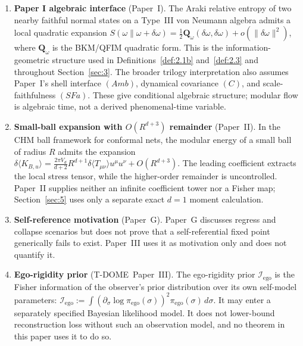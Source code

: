 \documentclass[12pt]{article}
\theoremstyle{definition}
\theoremstyle{remark}
\begin{document}
\begin{enumerate}
\item \textbf{Paper I algebraic interface} (Paper~I\cite{PaperI}).
The Araki relative entropy of two nearby faithful normal states on a
Type~III von Neumann algebra admits a local quadratic expansion
\(S(\omega\|\omega+\delta\omega)=\tfrac{1}{2}\mathbf{Q}_\omega
(\delta\omega,\delta\omega)+o(\|\delta\omega\|^2)\), where
\(\mathbf{Q}_\omega\) is the BKM/QFIM quadratic form. This is the
information-geometric structure used in Definitions~\ref{def:2.1b}
and~\ref{def:2.3} and throughout Section~\ref{sec:3}. The broader
trilogy interpretation also assumes Paper~I's shell interface \((Amb)\),
dynamical covariance \((C)\), and scale-faithfulness \((SFa)\). These
give conditional algebraic structure; modular flow is algebraic time,
not a derived phenomenal-time variable.

\item \textbf{Small-ball expansion with \(O(R^{d+3})\) remainder}
(Paper~II\cite{PaperII}).
In the CHM ball framework for conformal nets, the modular energy of a
small ball of radius \(R\) admits the expansion
\(\delta\langle K_{B,u}\rangle = \frac{2\pi V_d}{d+2}R^{d+1}
\delta\langle T_{\mu\nu}\rangle u^\mu u^\nu + O(R^{d+3})\).
The leading coefficient extracts the local stress tensor, while the
higher-order remainder is uncontrolled. Paper~II supplies neither an
infinite coefficient tower nor a Fisher map; Section~\ref{sec:5} uses
only a separate exact \(d=1\) moment calculation.

\item \textbf{Self-reference motivation} (Paper~G\cite{PaperG}).
Paper~G discusses regress and collapse scenarios but does not prove that
a self-referential fixed point generically fails to exist. Paper~III
uses it as motivation only and does not quantify it.

\item \textbf{Ego-rigidity prior}
(T-DOME~Paper~III\cite{TDOMEIII}).
The ego-rigidity prior \(\mathcal{I}_{\mathrm{ego}}\) is the Fisher
information of the observer's prior distribution over its own
self-model parameters:
\(\mathcal{I}_{\mathrm{ego}}:=\int(\partial_\sigma\log
\pi_{\mathrm{ego}}(\sigma))^2\pi_{\mathrm{ego}}(\sigma)\,d\sigma\).
It may enter a separately specified Bayesian likelihood model. It does
not lower-bound reconstruction loss without such an observation model,
and no theorem in this paper uses it to do so.
\end{enumerate}
 
\newpage
{}
\end{document}
